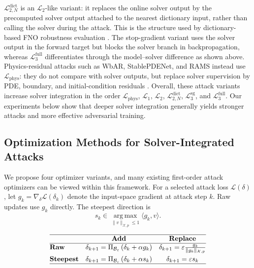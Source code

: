 ﻿\documentclass[letterpaper]{article} %
\begin{document}
$\mathcal{L}_{2,N}^{\mathrm{dict}}$ is an $\mathcal{L}_2$-like variant: it
replaces the online solver output by the precomputed solver output attached to
the nearest dictionary input, rather than calling the solver during the attack.
This is the structure used by dictionary-based FNO robustness evaluation
\citep{adesoji2022evaluating}. The stop-gradient variant uses the solver output
in the forward target but blocks the solver branch in backpropagation, whereas
$\mathcal{L}_3^{\mathrm{full}}$ differentiates through the model--solver
difference as shown above. Physics-residual attacks such as WbAR, StablePDENet,
and RAMS instead use $\mathcal{L}_{\mathrm{phys}}$: they do not compare with
solver outputs, but replace solver supervision by PDE, boundary, and
initial-condition residuals
\citep{shi2025wbar,huang2026stablepdenet,ouyang2025rams}.
Overall, these attack variants increase solver integration in the order
$\mathcal{L}_{\mathrm{phys}}$, $\mathcal{L}_1$, $\mathcal{L}_2$,
$\mathcal{L}_{2,N}^{\mathrm{dict}}$, $\mathcal{L}_3^{\mathrm{sg}}$, and
$\mathcal{L}_3^{\mathrm{full}}$.
Our experiments below show that deeper solver integration generally yields
stronger attacks and more effective adversarial training.

\subsection{Optimization Methods for Solver-Integrated Attacks}

We propose four optimizer variants, and many existing first-order attack
optimizers can be viewed within this framework. For a selected attack loss
$\mathcal{L}(\delta)$, let
$g_k=\nabla_\delta\mathcal{L}(\delta_k)$ denote the input-space gradient at
attack step $k$. Raw updates use $g_k$ directly. The steepest direction is
\begin{equation*}
  s_k \in \operatorname*{arg\,max}_{\|v\|_{\mathcal{X},p}\le 1}
  \langle g_k,v\rangle .
\end{equation*}

\[
\begin{array}{@{}lcc@{}}
\hline
& \textbf{Add} & \textbf{Replace} \\
\hline
\textbf{Raw}
&
\delta_{k+1}
=
\Pi_{\mathcal{B}_\varepsilon}
\left(\delta_k+\alpha g_k\right)
&
\delta_{k+1}
=
\varepsilon
\frac{g_k}{\|g_k\|_{\mathcal{X},p}}
\\[0.5em]
\textbf{Steepest}
&
\delta_{k+1}
=
\Pi_{\mathcal{B}_\varepsilon}
\left(\delta_k+\alpha s_k\right)
&
\delta_{k+1}
=
\varepsilon s_k
\\
\hline
\end{array}
\]
\end{document}
